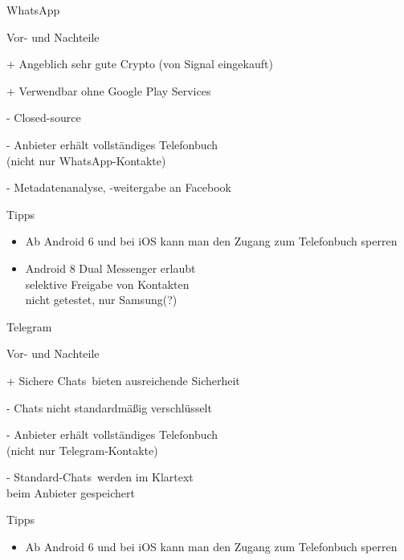 
\begin{frame}{WhatsApp}
  \begin{blex}{Vor- und Nachteile}
    \item[+] Angeblich sehr gute Crypto (von Signal eingekauft)
    \item[+] Verwendbar ohne Google Play Services
    \item[-] Closed-source
    \item[-] Anbieter erhält vollständiges Telefonbuch\\
             (nicht nur WhatsApp-Kontakte)
    \item[-] Metadatenanalyse, -weitergabe an Facebook
  \end{blex}
  \begin{block}{Tipps}
    \begin{itemize}
      \item Ab Android 6 und bei iOS kann man den Zugang zum Telefonbuch sperren
      \item Android 8 Dual Messenger erlaubt\\selektive Freigabe von Kontakten\\
            \scriptsize nicht getestet, nur Samsung(?)
    \end{itemize}
  \end{block}
\end{frame}

\begin{frame}{Telegram}
  \begin{blex}{Vor- und Nachteile}
    \item[+] \glqq Sichere Chats\grqq\ bieten ausreichende Sicherheit
    \item[-] Chats nicht standardmäßig verschlüsselt
    \item[-] Anbieter erhält vollständiges Telefonbuch\\ (nicht nur Telegram-Kontakte)
    \item[-] \glqq Standard-Chats\grqq\ werden im Klartext\\beim Anbieter gespeichert
  \end{blex}
  \begin{block}{Tipps}
    \begin{itemize}
      \item Ab Android 6 und bei iOS kann man den Zugang zum Telefonbuch sperren
    \end{itemize}
  \end{block}
\end{frame}

